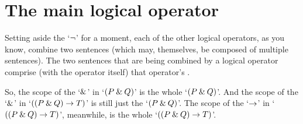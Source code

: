 \section{The main logical operator}
\label{main_logical_operator}

Setting aside the `${\neg}$' for a moment, each of the other logical operators, as you know, combine two sentences (which may, themselves, be composed of multiple sentences). The two sentences that are being combined by a logical operator comprise (with the operator itself) that operator's . 

So, the scope of the `$\mathbin{\&}$' in `$(P \mathbin{\&} Q)$' is the whole `$(P \mathbin{\&} Q)$'. And the scope of the `$\mathbin{\&}$' in `$((P \mathbin{\&} Q) \rightarrow T)$' is still just the `$(P \mathbin{\&} Q)$'. The scope of the `$\rightarrow$' in `$((P \mathbin{\&} Q) \rightarrow T)$', meanwhile, is the whole `$((P \mathbin{\&} Q) \rightarrow T)$'.



